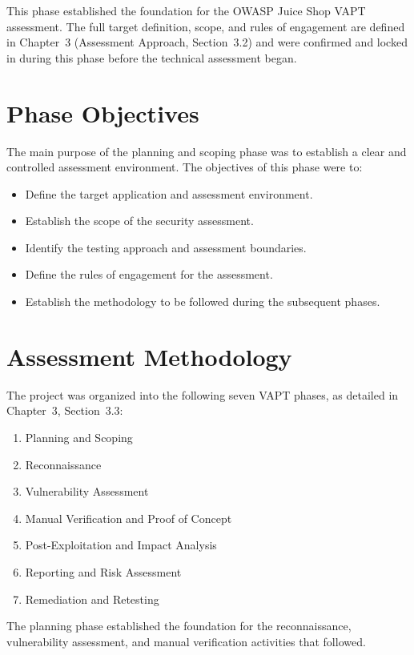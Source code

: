 This phase established the foundation for the OWASP Juice Shop VAPT
assessment. The full target definition, scope, and rules of
engagement are defined in Chapter~3 (Assessment Approach,
Section~3.2) and were confirmed and locked in during this phase
before the technical assessment began.

\section{Phase Objectives}

The main purpose of the planning and scoping phase was to establish a
clear and controlled assessment environment. The objectives of this
phase were to:

\begin{itemize}
    \item Define the target application and assessment environment.
    \item Establish the scope of the security assessment.
    \item Identify the testing approach and assessment boundaries.
    \item Define the rules of engagement for the assessment.
    \item Establish the methodology to be followed during the
    subsequent phases.
\end{itemize}

\section{Assessment Methodology}

The project was organized into the following seven VAPT phases, as
detailed in Chapter~3, Section~3.3:

\begin{enumerate}
    \item Planning and Scoping
    \item Reconnaissance
    \item Vulnerability Assessment
    \item Manual Verification and Proof of Concept
    \item Post-Exploitation and Impact Analysis
    \item Reporting and Risk Assessment
    \item Remediation and Retesting
\end{enumerate}

The planning phase established the foundation for the reconnaissance,
vulnerability assessment, and manual verification activities that
followed.

